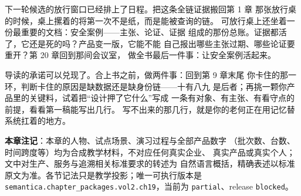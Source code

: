 下一轮候选的放行窗口已经排上了日程。把这条全链证据搬回第 1 章
那张放行桌的时候，桌上摞着的将第一次不是纸，而是能被查询的链。
可放行桌上还坐着一份最重要的文档：安全案例——主张、论证、证据
组成的那份总账。证据都活了，它还是死的吗？产品变一版，它能不能
自己报出哪些主张过期、哪些论证要重开？第 20 章回到那间会议室，
做全书最后一件事：让安全案例活起来。

导读的承诺可以兑现了。合上书之前，做两件事：回到第 9 章末尾
你卡住的那一环，判断卡住的原因是缺数据还是缺身份链——十有八九
是后者；再挑一颗你产品里的关键料，试着把“设计押了它什么”写成
一条有对象、有主张、有看守点的前提，看看第一稿能写出几行。
写不出来的那几行，就是你的老何正在用记忆替系统扛着的地方。


\begin{noteblock}
\textbf{本章注记}：本章的人物、试点场景、演习过程与全部产品数字
（批次数、台数、时间跨度等）均为合成教学材料，不对应任何真实企业、
真实产品或真实个人；文中对生产、服务与追溯相关标准要求的转述为
自然语言概括，精确表述以标准原文为准。各节记法只是教学投影；唯一可执行版本是
\nolinkurl{semantica.chapter_packages.vol2.ch19}，当前为 \nolinkurl{partial}、release \nolinkurl{blocked}。
\end{noteblock}
